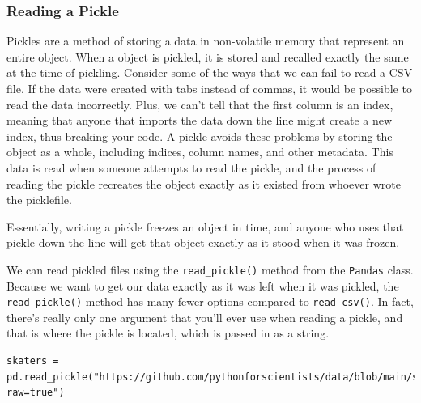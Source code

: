 \subsubsection{Reading a Pickle}
Pickles are a method of storing a data in non-volatile memory that represent an entire  object. When a  object is pickled, it is stored and recalled exactly the same at the time of pickling. Consider some of the ways that we can fail to read a CSV file. If the data were created with tabs instead of commas, it would be possible to read the data incorrectly. Plus, we can't tell  that the first column is an index, meaning that anyone that imports the data down the line might create a new index, thus breaking your code. A pickle avoids these problems by storing the object as a whole, including indices, column names, and other metadata. This data is read when someone attempts to read the pickle, and the process of reading the pickle recreates the object exactly as it existed from whoever wrote the picklefile.\par
Essentially, writing a pickle freezes an object in time, and anyone who uses that pickle down the line will get that object exactly as it stood when it was frozen.\par
We can read pickled files using the \verb|read_pickle()| method from the \verb|Pandas| class. Because we want to get our data exactly as it was left when it was pickled, the \verb|read_pickle()| method has many fewer options compared to \verb|read_csv()|. In fact, there's really only one argument that you'll ever use when reading a pickle, and that is where the pickle is located, which is passed in as a string.\par
\begin{lstlisting}[style=pippython]
skaters = pd.read_pickle("https://github.com/pythonforscientists/data/blob/main/skaters.pkl?raw=true")
\end{lstlisting}
